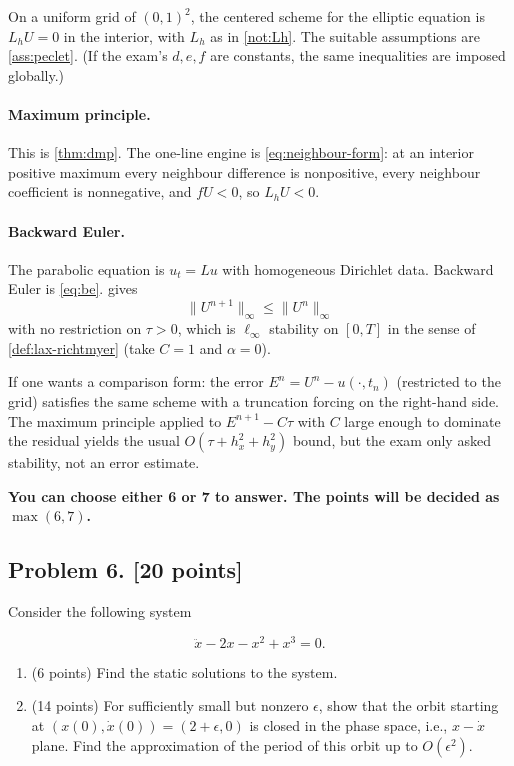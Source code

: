 \documentclass[11pt,a4paper]{article}
\begin{document}
On a uniform grid of \((0,1)^2\), the centered scheme for the elliptic equation is \(L_h U=0\) in the interior, with \(L_h\) as in \cref{not:Lh}. The suitable assumptions are \cref{ass:peclet}. (If the exam's \(d,e,f\) are constants, the same inequalities are imposed globally.)

\paragraph{Maximum principle.}

This is \cref{thm:dmp}. The one-line engine is \eqref{eq:neighbour-form}: at an interior positive maximum every neighbour difference is nonpositive, every neighbour coefficient is nonnegative, and \(fU<0\), so \(L_h U<0\).

\paragraph{Backward Euler.}

The parabolic equation is \(u_t=Lu\) with homogeneous Dirichlet data. Backward Euler is \eqref{eq:be}.  gives
\[
\|U^{n+1}\|_\infty\le\|U^n\|_\infty
\]
with no restriction on \(\tau>0\), which is \(\ell_\infty\) stability on \([0,T]\) in the sense of \cref{def:lax-richtmyer} (take \(C=1\) and \(\alpha=0\)).

If one wants a comparison form: the error \(E^n=U^n-u(\cdot,t_n)\) (restricted to the grid) satisfies the same scheme with a truncation forcing on the right-hand side. The maximum principle applied to \(E^{n+1}-C\tau\) with \(C\) large enough to dominate the residual yields the usual \(O(\tau+h_x^2+h_y^2)\) bound, but the exam only asked stability, not an error estimate.


\noindent\textbf{You can choose either 6 or 7 to answer. The points will be decided as \(\max(6, 7)\).}

\subsection{Problem 6. [20 points]}
Consider the following system

\[
\ddot{x} - 2x - x^{2} + x^{3} = 0.
\]

\begin{enumerate}[label=(\alph*)]
    \item (6 points) Find the static solutions to the system.
    \item (14 points) For sufficiently small but nonzero \(\epsilon\), show that the orbit starting at \((x(0), \dot{x}(0)) = (2 + \epsilon, 0)\) is closed in the phase space, i.e., \(x - \dot{x}\) plane. Find the approximation of the period of this orbit up to \(O(\epsilon^{2})\).
\end{enumerate}
\end{document}
